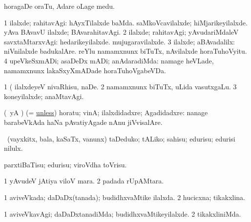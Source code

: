 \noindent
\gl{\pagu}
\expl{}
\bmng
{} horagaDe oraTu, Adare oLage medu. 
\emng
\eentry

\bentry
{} 
\gl{\upa}
\expl{}
\bmng
\bnum
\num{1} ilalxde; rahitavAgi:  hAyxTilalxde baMda.  saMkoVcavilalxde; hiMjarikeyilalxde.  yAva BAvavU ilalxde; BAvarahitavAgi. 
\num{2} ilalxde; rahitavAgi; yAvudariMdaleV savxtaMtarxvAgi:  hedarikeyilalxde.  mujugaravilalxde. 
\num{3} ilalxde; aBAvadalilx:  niVnilalxde badukalAre.  reYlu namamxnunx biTuTx, nAvilalxde horaTuhoVyitu. 
\num{4} upeVkeSxmADi; asaDeDx mADi; anAdaradiMda:  namage heVLade, namamxnunx lakaSxyXmADade horaTuhoVgabeVDa. 
\enum
\emng

\noindent
\gl{\pagu}
\expl{}
\bmng
\bnum
\num{1}  (  ilalxdeyeV nivaRhisu, naDe. 
\num{2}  namamxnunx biTuTx, uLida vasutxgaLu. 
\num{3}  koneyilalxde; anaMtavAgi. 
\enum
\emng
\eentry

\bentry
{} 
\gl{\saMavayx}
\expl{}
\bmng
(\pArxparx\ yA \asaM) (= \hyperref{kandict_u.pdf}{U}{unless}{unless}) horatu; vinA; ilalxdidadxre; Agadidadxre:  nanage barabeVkAda haNa pAvatiyAgade nAnu jiVvisalAre. 
\emng
\eentry

\bentry
{} 
\gl{\kirx}
\bmng
 \sakirx\ (vayxkitx, bala, kaSaTx, \mo vanunx) taDeduko; tALiko; sahisu; edurisu; edurisi nilulx. 
\emng

\noindent
\gl{\akirx}
\expl{}
\bmng
parxtiBaTisu; edurisu; viroVdha toVrisu. 
\emng
\eentry

\bentry
{} 
\gl{\nA}
\bmng
\bnum
\num{1} yAvudeV jAtiya viloV mara. 
\num{2}  padada rUpAMtara. 
\enum
\emng
\eentry

\bentry
{} 
\gl{\gu}
\expl{}
\bmng
\bnum
\num{1} aviveVkada; daDaDx(tanada); budidhxvaMtike ilalxda. 
\num{2} hucicxna; tikakxlina. 
\enum
\emng
\eentry

\bentry
{} 
\gl{\kirxvi}
\expl{}
\bmng
\bnum
\num{1} aviveVkavAgi; daDaDxtanadiMda; budidhxvaMtikeyilalxde. 
\num{2} tikakxliniMda. 
\enum
\emng
\eentry

